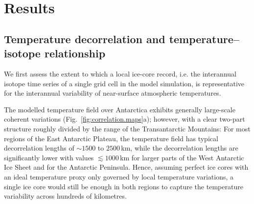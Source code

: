 \documentclass[cp, manuscript]{copernicus}
\begin{document}
\section{Results}\label{results}

\subsection{Temperature decorrelation and temperature--isotope relationship}
\label{results:t2m-iso}

We first assess the extent to which a local ice-core record, i.e. the
interannual isotope time series of a single grid cell in the model simulation,
is representative for the interannual variability of near-surface atmospheric
temperatures.

The modelled temperature field over Antarctica exhibits generally large-scale
coherent variations (Fig.~\ref{fig:correlation.maps}a); however, with a clear
two-part structure roughly divided by the range of the Transantarctic Mountains:
For most regions of the East Antarctic Plateau, the temperature field has
typical decorrelation lengths of $\sim1500$ to $2500$\,km, while the
decorrelation lengths are significantly lower with values $\lesssim1000$\,km for
larger parts of the West Antarctic Ice Sheet and for the Antarctic Peninsula.
Hence, assuming perfect ice cores with an ideal temperature proxy only governed
by local temperature variations, a single ice core would still be enough in both
regions to capture the temperature variability across hundreds of kilometres.
\end{document}
